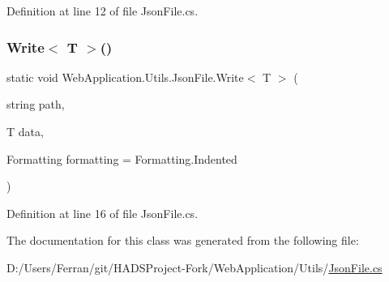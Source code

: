 Definition at line 12 of file Json\+File.\+cs.

\mbox{\label{classWebApplication_1_1Utils_1_1JsonFile_a2d4f23a606776d2a8d5f40a0532ab25b}} 
\subsubsection{\texorpdfstring{Write$<$ T $>$()}{Write< T >()}}
{\footnotesize\ttfamily static void Web\+Application.\+Utils.\+Json\+File.\+Write$<$ T $>$ (\begin{DoxyParamCaption}\item[{string}]{path,  }\item[{T}]{data,  }\item[{Formatting}]{formatting = {\ttfamily Formatting.Indented} }\end{DoxyParamCaption})\hspace{0.3cm}{\ttfamily [static]}}



Definition at line 16 of file Json\+File.\+cs.



The documentation for this class was generated from the following file\+:\begin{DoxyCompactItemize}
\item 
D\+:/\+Users/\+Ferran/git/\+H\+A\+D\+S\+Project-\/\+Fork/\+Web\+Application/\+Utils/\mbox{\hyperlink{JsonFile_8cs}{Json\+File.\+cs}}\end{DoxyCompactItemize}
